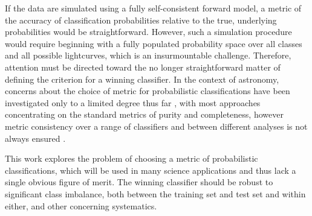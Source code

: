 If the data are simulated using a fully self-consistent forward model, a metric of the accuracy of classification probabilities relative to the true, underlying probabilities would be straightforward.
However, such a simulation procedure would require beginning with a fully populated probability space over all classes and all possible lightcurves, which is an insurmountable challenge.
Therefore, attention must be directed toward the no longer straightforward matter of defining the criterion for a winning classifier.
In the context of astronomy, concerns about the choice of metric for probabilistic classifications have been investigated only to a limited degree thus far \citep{florios_forecasting_2018, kim_stargalaxy_2017},
with most approaches concentrating on the standard metrics of purity and completeness, however metric consistency over a range of classifiers and between different analyses is not always ensured \citep{bethapudi_separation_2018}.

This work explores the problem of choosing a metric of probabilistic classifications, which will be used in many science applications and thus lack a single obvious figure of merit.
The winning classifier should be robust to significant class imbalance, both between the training set and test set and within either, and other concerning systematics.

